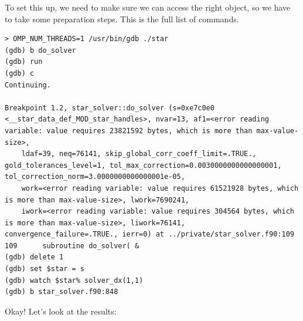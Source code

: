 \documentclass[a4paper,10pt]{article}
\begin{document}
To set this up, we need to make sure we can access the right object, so we have to take some preparation steps. This is the full list of commands.
\begin{verbatim}
> OMP_NUM_THREADS=1 /usr/bin/gdb ./star
(gdb) b do_solver
(gdb) run
(gdb) c
Continuing.

Breakpoint 1.2, star_solver::do_solver (s=0xe7c0e0 <__star_data_def_MOD_star_handles>, nvar=13, af1=<error reading variable: value requires 23821592 bytes, which is more than max-value-size>, 
    ldaf=39, neq=76141, skip_global_corr_coeff_limit=.TRUE., gold_tolerances_level=1, tol_max_correction=0.0030000000000000001, tol_correction_norm=3.0000000000000001e-05, 
    work=<error reading variable: value requires 61521928 bytes, which is more than max-value-size>, lwork=7690241, 
    iwork=<error reading variable: value requires 304564 bytes, which is more than max-value-size>, liwork=76141, convergence_failure=.TRUE., ierr=0) at ../private/star_solver.f90:109
109	     subroutine do_solver( &
(gdb) delete 1
(gdb) set $star = s
(gdb) watch $star% solver_dx(1,1)
(gdb) b star_solver.f90:848
\end{verbatim}
Okay! Let's look at the results:
\end{document}
